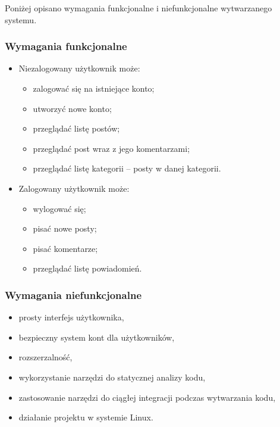 \documentclass[declaration,shortabstract,polish,inz]{iithesis}
\begin{document}
Poniżej opisano wymagania funkcjonalne i niefunkcjonalne wytwarzanego systemu.

\subsubsection{Wymagania funkcjonalne}

\begin{itemize}
    \item Niezalogowany użytkownik może: 
    \begin{itemize}
         \item zalogować się na istniejące konto;
         \item utworzyć nowe konto;
         \item przeglądać listę postów;
         \item przeglądać post wraz z jego komentarzami;
         \item przeglądać listę kategorii – posty w danej kategorii.
    \end{itemize}
    \item Zalogowany użytkownik może:
        \begin{itemize}
            \item wylogować się;
            \item pisać nowe posty;
            \item pisać komentarze;
            \item przeglądać listę powiadomień.
        \end{itemize}
\end{itemize}

\subsubsection{Wymagania niefunkcjonalne}
\begin{itemize}
    \item prosty interfejs użytkownika,
    \item bezpieczny system kont dla użytkowników,
    \item rozszerzalność,
    \item wykorzystanie narzędzi do statycznej analizy kodu,
    \item zastosowanie narzędzi do ciągłej integracji podczas wytwarzania kodu,
    \item działanie projektu w systemie Linux.
    
\end{itemize}
\end{document}
